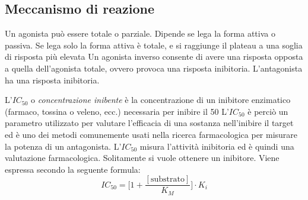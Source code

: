 \subsection{Meccanismo di reazione}

Un agonista può essere totale o parziale. Dipende se lega la forma
attiva o passiva. Se lega solo la forma attiva è totale, e si raggiunge
il plateau a una soglia di risposta più elevata
Un agonista inverso consente di avere una risposta opposta a quella
dell'agonista totale, ovvero provoca una risposta inibitoria.
L'antagonista ha una risposta inibitoria.

L'\(IC_{50}\) o \emph{concentrazione inibente} è la concentrazione di un inibitore enzimatico (farmaco, tossina o veleno, ecc.) necessaria per inibire il 50%
L'\(IC_{50}\) è perciò un parametro utilizzato per valutare l'efficacia di una sostanza nell'inibire il target ed è uno dei metodi comunemente usati nella ricerca farmacologica per misurare la potenza di un antagonista.
L'\(IC_{50}\) misura l'attività inibitoria ed è quindi una valutazione
farmacologica. Solitamente si vuole ottenere un inibitore.
Viene espressa secondo la seguente formula:
\[
IC_{50} = \biggl[1 + \frac{[\text{substrato}]}{K_M} \biggr] \cdot K_i
\]


